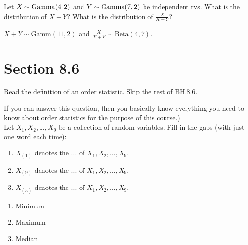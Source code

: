 \begin{exercise}
Let $X \sim \mathrm{Gamma}(4,2)$ and $Y \sim \mathrm{Gamma}(7,2)$ be independent rvs. What is the distribution of $X+Y$? What is the distribution of $\frac{X}{X+Y}$?

\begin{solution}
$X+Y \sim \text{Gamm}(11,2)$ and $\frac{X}{X+Y} \sim \text{Beta}(4,7)$.
\end{solution}
\end{exercise}





\section{Section 8.6}
\label{sec:section-8.6}

Read the definition of an order statistic. Skip the rest of BH.8.6.

\begin{exercise}
If you can answer this question, then you basically know everything you need to know about order statistics for the purpose of this course.)\\
Let $X_1,X_2,\ldots,X_9$ be a collection of random variables. Fill in the gaps (with just one word each time):
\begin{enumerate}
    \item $X_{(1)}$ denotes the ... of $X_1,X_2,\ldots,X_9$.
    \item $X_{(9)}$ denotes the ... of $X_1,X_2,\ldots,X_9$.
    \item $X_{(5)}$ denotes the ... of $X_1,X_2,\ldots,X_9$.
\end{enumerate}
\begin{solution}
\begin{enumerate}
    \item Minimum
    \item Maximum
    \item Median
\end{enumerate}
\end{solution}
\end{exercise}








